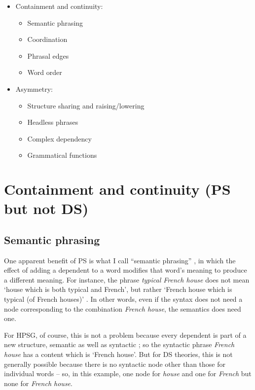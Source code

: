\documentclass[output=paper]{langscibook}
\begin{document}
\begin{itemize}
	\item  Containment and continuity:
	\begin{itemize}
		\item Semantic phrasing
		
		\item Coordination
		
		\item Phrasal edges
		
		\item Word order
	\end{itemize}

	\item Asymmetry:
	\begin{itemize}
		\item Structure sharing and raising/lowering
		
		\item Headless phrases
		
		\item Complex dependency
		
		\item Grammatical functions
	\end{itemize}
\end{itemize}


\section{Containment and continuity (PS but not DS)}
\label{sec:4}

\subsection{Semantic phrasing}
\label{sec:4.1}

One apparent benefit of PS is what I call ``semantic phrasing'' \citep[146–151]{Hudson90a-u}, in which the effect of adding a dependent to a word modifies that word’s meaning to produce a different meaning. For instance, the phrase \emph{typical French house} does not mean ‘house which is both typical and French’, but rather ‘French house which is typical (of French houses)’ \citep{Dahl80a}. In other words, even if the syntax does not need a node corresponding to the combination \emph{French house}, the semantics does need one.

For HPSG, of course, this is not a problem because every dependent is part of a new structure, semantic as well as syntactic \citep{MuellerEvaluating}; so the syntactic phrase \emph{French house} has a content which is ‘French house’. But for DS theories, this is not generally possible because there is no syntactic node other than those for individual words – so, in this example, one node for \emph{house} and one for \emph{French} but none for \emph{French house}.
\end{document}
